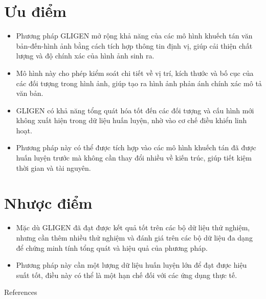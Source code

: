 \documentclass[12pt]{report}
\begin{document}
\section{Ưu điểm}

\begin{itemize}
	\item Phương pháp GLIGEN mở rộng khả năng của các mô hình khuếch tán văn bản-đến-hình ảnh
	      bằng cách tích hợp thông tin định vị, giúp cải thiện chất lượng và độ chính xác của hình ảnh sinh ra.
	\item Mô hình này cho phép kiểm soát chi tiết về vị trí, kích thước và bố cục của các đối tượng trong hình ảnh,
	      giúp tạo ra hình ảnh phản ánh chính xác mô tả văn bản.
	\item GLIGEN có khả năng tổng quát hóa tốt đến các đối tượng và cấu hình mới không xuất hiện trong dữ liệu huấn luyện,
	      nhờ vào cơ chế điều khiển linh hoạt.
	\item Phương pháp này có thể được tích hợp vào các mô hình khuếch tán đã được huấn luyện trước mà không cần thay đổi nhiều về kiến trúc,
	      giúp tiết kiệm thời gian và tài nguyên.
\end{itemize}

\section{Nhược điểm}

\begin{itemize}
	\item Mặc dù GLIGEN đã đạt được kết quả tốt trên các bộ dữ liệu thử nghiệm,
	      nhưng cần thêm nhiều thử nghiệm và đánh giá trên các bộ dữ liệu đa dạng để chứng minh tính tổng quát và hiệu quả của phương pháp.
	\item Phương pháp này cần một lượng dữ liệu huấn luyện lớn để đạt được hiệu suất tốt,
	      điều này có thể là một hạn chế đối với các ứng dụng thực tế.
\end{itemize}
\newpage
 {References}
\end{document}
